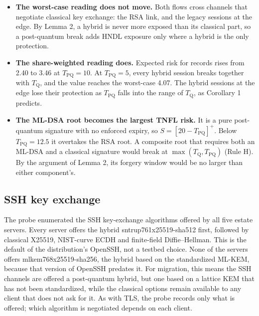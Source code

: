 \documentclass[conference]{IEEEtran}
\newcommand{\Tq}{T_{\mathrm{Q}}}
\newcommand{\pos}[1]{\left[#1\right]^{+}}
\begin{document}
\begin{itemize}
\item \textbf{The worst-case reading does not move.} Both flows cross channels that negotiate classical key exchange: the RSA link, and the legacy sessions at the edge. By Lemma 2, a hybrid is never more exposed than its classical part, so a post-quantum break adds HNDL exposure only where a hybrid is the only protection.
\item \textbf{The share-weighted reading does.} Expected risk for records rises from 2.40 to 3.46 at $T_{\mathrm{PQ}} = 10$. At $T_{\mathrm{PQ}} = 5$, every hybrid session breaks together with $\Tq$, and the value reaches the worst-case 4.07. The hybrid sessions at the edge lose their protection as $T_{\mathrm{PQ}}$ falls into the range of $\Tq$, as Corollary 1 predicts.
\item \textbf{The ML-DSA root becomes the largest TNFL risk.} It is a pure post-quantum signature with no enforced expiry, so $S = \pos{20 - T_{\mathrm{PQ}}}$. Below $T_{\mathrm{PQ}} = 12.5$ it overtakes the RSA root. A composite root that requires both an ML-DSA and a classical signature would break at $\max(\Tq, T_{\mathrm{PQ}})$ (Rule H). By the argument of Lemma 2, its forgery window would be no larger than either component's.
\end{itemize}

\subsection{SSH key exchange}\label{sec:13.8}

The probe enumerated the SSH key-exchange algorithms offered by all five estate servers. Every server offers the hybrid sntrup761x25519-sha512 first, followed by classical X25519, NIST-curve ECDH and finite-field Diffie–Hellman. This is the default of the distribution's OpenSSH, not a testbed choice. None of the servers offers mlkem768x25519-sha256, the hybrid based on the standardized ML-KEM, because that version of OpenSSH predates it. For migration, this means the SSH channels are offered a post-quantum hybrid, but one based on a lattice KEM that has not been standardized, while the classical options remain available to any client that does not ask for it. As with TLS, the probe records only what is offered; which algorithm is negotiated depends on each client.
\end{document}
